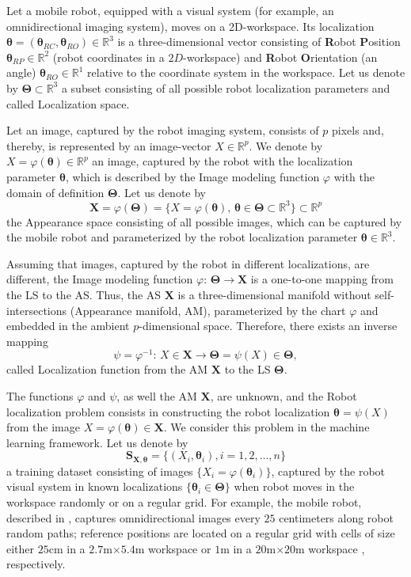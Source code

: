 \documentclass[conference]{IEEEtran} %
\def\mbTheta{{\bm\Theta}}
\def\mbtheta{{\bm\theta}}
\def\mbX{\mathbf{X}}
\def\mbS{\mathbf{S}}
\def\RR{\mathbb{R}}
\begin{document}
Let a mobile robot, equipped with a visual system (for example, an omnidirectional imaging system), moves on a 2D-workspace. Its localization $\mbtheta = (\mbtheta_{RC},\mbtheta_{RO})\in\RR^3$ is a three-dimensional vector consisting of \textbf{R}obot \textbf{P}osition $\mbtheta_{RP} \in \RR^2$ (robot coordinates in a $2D$-workspace) and \textbf{R}obot \textbf{O}rientation (an angle) $\mbtheta_{RO}\in\RR^1$ relative to the coordinate system in the workspace. Let us denote by $\mbTheta\subset\RR^3$ a subset consisting of all possible robot localization parameters and called Localization space.

Let an image, captured by the robot imaging system, consists of $p$ pixels and, thereby, is represented by an image-vector $X \in \RR^p$. We denote by $X =\varphi(\mbtheta)\in\RR^p$ an image, captured by the robot with the localization parameter $\mbtheta$, which is described by the Image modeling function $\varphi$ with the domain of definition $\mbTheta$. Let us denote by
\begin{equation}
\label{eq1}
\mbX = \varphi(\mbTheta) = \{X = \varphi(\mbtheta),\,\mbtheta\in\mbTheta\subset\RR^3\}\subset\RR^p
\end{equation}
the Appearance space consisting of all possible images, which can be captured by the mobile robot and parameterized by the robot localization parameter $\mbtheta\in\RR^3$.

Assuming that images, captured by the robot in different localizations, are different, the Image modeling function $\varphi:\,\mbTheta\to\mbX$ is a one-to-one mapping from the LS to the AS. Thus, the AS $\mbX$ is a three-dimensional manifold without self-intersections (Appearance manifold, AM), parameterized by the chart $\varphi$ and  embedded in the ambient $p$-dimensional space. Therefore, there exists an inverse mapping
\begin{equation}
\label{eq2}
	\psi = \varphi^{-1}:\,X\in\mbX\to\mbTheta = \psi(X) \in \mbTheta,
\end{equation}
called Localization function from the AM $\mbX$ to the LS $\mbTheta$.

The functions $\varphi$ and $\psi$, as well the AM $\mbX$, are unknown, and the Robot localization problem consists in constructing the robot localization $\mbtheta = \psi(X)$ from the image $X = \varphi(\mbtheta) \in \mbX$. We consider this problem in the machine learning framework. Let us denote by
\begin{equation}
\label{eq3}
	\mbS_{\mathbf{X},\mbtheta} = \{(X_i,\mbtheta_i), i = 1, 2, \ldots, n\}
\end{equation}
a training dataset consisting of images $\{X_i = \varphi(\mbtheta_i)\}$, captured by the robot visual system in known localizations $\{\mbtheta_i \in \mbTheta\}$ when robot moves in the workspace randomly or on a regular grid. For example, the mobile robot, described in \cite{bib7}, captures omnidirectional images every $25$ centimeters along robot random paths; reference positions are located on a regular grid with cells of size either $25$cm in a $2.7$m$\times5.4$m workspace \cite{bib8} or $1$m in a $20$m$\times20$m workspace \cite{bib9}, respectively.
\end{document}

